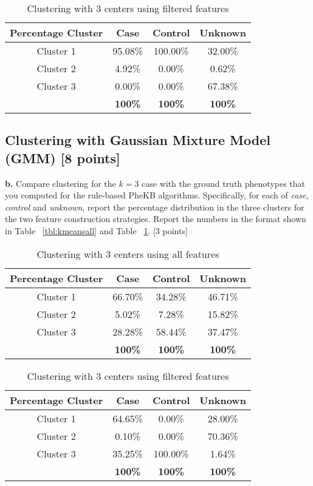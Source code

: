 \documentclass[12pt]{article}
\begin{document}
\begin{table}[h]
\centering
\begin{tabular}{ c | c | c | c }
  \hline
  Percentage Cluster & Case & Control & Unknown\\
  \hline                       
  Cluster 1 & 95.08\% & 100.00\% & 32.00\% \\
  Cluster 2 & 4.92\% & 0.00\% & 0.62\% \\
  Cluster 3 & 0.00\% & 0.00\% & 67.38\% \\
  \hline  
   & \bf{100\%} & \bf{100\%} & \bf{100\%} \\
  \hline  
\end{tabular}
\caption{Clustering with 3 centers using filtered features}
\label{tbl:kmeansfil}
\end{table}

\subsection{Clustering with Gaussian Mixture Model (GMM) [8 points]}

\textbf{b.} Compare clustering for the $k=3$ case with the ground truth phenotypes that you computed for the rule-based PheKB algorithms. Specifically, for each of \textit{case}, \textit{control} and \textit{unknown}, report the percentage distribution in the three clusters for the two feature construction strategies. Report the numbers in the format shown in Table ~\ref{tbl:kmeansall} and Table ~\ref{tbl:kmeansfil}. [3 points]\\

\begin{table}[h]
\centering
\begin{tabular}{ c | c | c | c }
  \hline
  Percentage Cluster & Case & Control & Unknown\\
  \hline                       
  Cluster 1 & 66.70\% & 34.28\% & 46.71\% \\
  Cluster 2 & 5.02\% & 7.28\% & 15.82\% \\
  Cluster 3 & 28.28\% & 58.44\% & 37.47\% \\
  \hline  
   & \bf{100\%} & \bf{100\%} & \bf{100\%} \\
  \hline  
\end{tabular}
\caption{Clustering with 3 centers using all features}
\label{tbl:gmmall}
\end{table}

\begin{table}[h]
\centering
\begin{tabular}{ c | c | c | c }
  \hline
  Percentage Cluster & Case & Control & Unknown\\
  \hline                       
  Cluster 1 & 64.65\% & 0.00\% & 28.00\% \\
  Cluster 2 & 0.10\% & 0.00\% & 70.36\% \\
  Cluster 3 & 35.25\% & 100.00\% & 1.64\% \\
  \hline  
   & \bf{100\%} & \bf{100\%} & \bf{100\%} \\
  \hline  
\end{tabular}
\caption{Clustering with 3 centers using filtered features}
\label{tbl:gmmfil}
\end{table}
\end{document}
